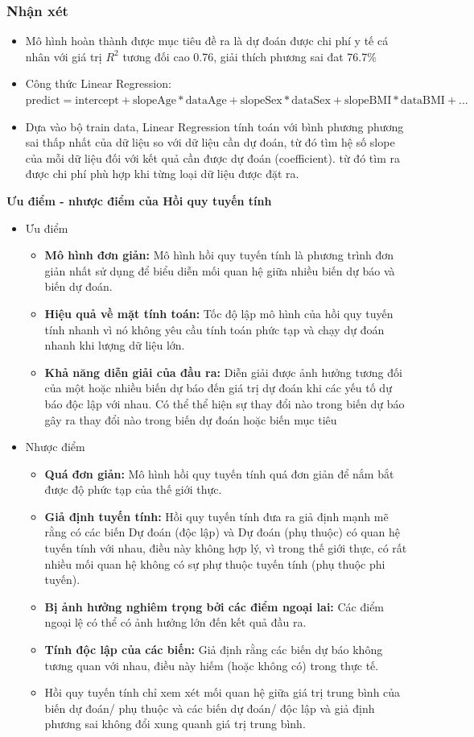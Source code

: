 \documentclass{article}
\begin{document}
	\subsubsection{Nhận xét}
	\begin{itemize}
		\item Mô hình hoàn thành được mục tiêu đề ra là dự đoán được chi phí y tế cá nhân với giá trị $R^2$ tương đối cao 0.76, giải thích phương sai đat 76.7\%
		\item Công thức Linear Regression: $\text{predict} = \text{intercept} + \text{slopeAge} * \text{dataAge} + \text{slopeSex} * \text{dataSex} + \text{slopeBMI} * \text{dataBMI} + ...$
		\item Dựa vào bộ train data, Linear Regression tính toán với bình phương phương sai thấp nhất của dữ liệu so với dữ liệu cần dự đoán, từ đó tìm hệ số slope của mỗi dữ liệu đối với kết quả cần được dự đoán (coefficient). từ đó tìm ra được chi phí phù hợp khi từng loại dữ liệu được đặt ra.
	\end{itemize}
	\textbf{Ưu điểm - nhược điểm của Hồi quy tuyến tính}
	\begin{itemize}
		\item Ưu điểm
		\begin{itemize}
			\item \textbf{Mô hình đơn giản:} Mô hình hồi quy tuyến tính là phương trình đơn giản nhất sử dụng để biểu diễn mối quan hệ giữa nhiều biến dự báo và biến dự đoán.
			\item \textbf{Hiệu quả về mặt tính toán:} Tốc độ lập mô hình của hồi quy tuyến tính nhanh vì nó không yêu cầu tính toán phức tạp và chạy dự đoán nhanh khi lượng dữ liệu lớn.
			\item \textbf{Khả năng diễn giải của đầu ra:} Diễn giải được ảnh hưởng tương đối của một hoặc nhiều biến dự báo đến giá trị dự đoán khi các yếu tố dự báo độc lập với nhau. Có thể thể hiện sự thay đổi nào trong biến dự báo gây ra thay đổi nào trong biến dự đoán hoặc biến mục tiêu
		\end{itemize}
		\item Nhược điểm
		\begin{itemize}
			\item \textbf{Quá đơn giản:} Mô hình hồi quy tuyến tính quá đơn giản để nắm bắt được độ phức tạp của thế giới thực.
			\item \textbf{Giả định tuyến tính:} Hồi quy tuyến tính đưa ra giả định mạnh mẽ rằng có các biến Dự đoán (độc lập) và Dự đoán (phụ thuộc) có quan hệ tuyến tính với nhau, điều này không hợp lý, vì trong thế giới thực, có rất nhiều mối quan hệ không có sự phự thuộc tuyến tính (phụ thuộc phi tuyến).
			\item \textbf{Bị ảnh hưởng nghiêm trọng bởi các điểm ngoại lai:} Các điểm ngoại lệ có thể có ảnh hưởng lớn đến kết quả đầu ra.
			\item \textbf{Tính độc lập của các biến:} Giả định rằng các biến dự báo không tương quan với nhau, điều này hiếm (hoặc không có) trong thực tế.
			\item Hồi quy tuyến tính chỉ xem xét mối quan hệ giữa giá trị trung bình của biến dự đoán/ phụ thuộc và các biến dự đoán/ độc lập và giả định phương sai không đổi xung quanh giá trị trung bình.
		\end{itemize}
	\end{itemize}
\end{document}
